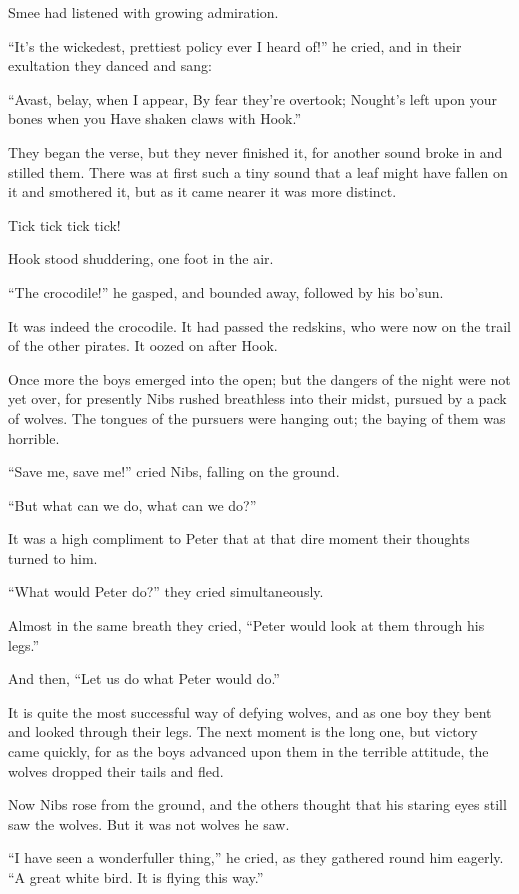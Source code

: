 Smee had listened with growing admiration.

``It's the wickedest, prettiest policy ever I heard of!'' he cried, and
in their exultation they danced and sang:

``Avast, belay, when I appear,
    By fear they're overtook;
Nought's left upon your bones when you
    Have shaken claws with Hook.''

They began the verse, but they never finished it, for another sound
broke in and stilled them. There was at first such a tiny sound that a
leaf might have fallen on it and smothered it, but as it came nearer it
was more distinct.

Tick tick tick tick!

Hook stood shuddering, one foot in the air.

``The crocodile!'' he gasped, and bounded away, followed by his bo'sun.

It was indeed the crocodile. It had passed the redskins, who were now
on the trail of the other pirates. It oozed on after Hook.

Once more the boys emerged into the open; but the dangers of the night
were not yet over, for presently Nibs rushed breathless into their
midst, pursued by a pack of wolves. The tongues of the pursuers were
hanging out; the baying of them was horrible.

``Save me, save me!'' cried Nibs, falling on the ground.

``But what can we do, what can we do?''

It was a high compliment to Peter that at that dire moment their
thoughts turned to him.

``What would Peter do?'' they cried simultaneously.

Almost in the same breath they cried, ``Peter would look at them through
his legs.''

And then, ``Let us do what Peter would do.''

It is quite the most successful way of defying wolves, and as one boy
they bent and looked through their legs. The next moment is the long
one, but victory came quickly, for as the boys advanced upon them in
the terrible attitude, the wolves dropped their tails and fled.

Now Nibs rose from the ground, and the others thought that his staring
eyes still saw the wolves. But it was not wolves he saw.

``I have seen a wonderfuller thing,'' he cried, as they gathered round
him eagerly. ``A great white bird. It is flying this way.''


